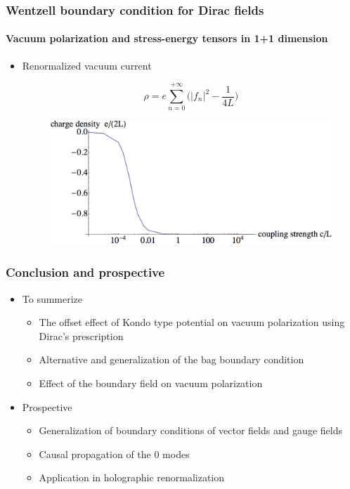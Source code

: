 \documentclass[french]{beamer}
\begin{document}
\begin{frame}
\frametitle{Wentzell boundary condition for Dirac fields}
\framesubtitle{Vacuum polarization and stress-energy tensors in 1+1 dimension}

\begin{itemize}
\item Renormalized vacuum current %

\begin{equation*}
\rho = e \sum_{n=0}^{+\infty}\big(|f_n|^2 -\frac{1}{4L} \big)
\end{equation*}


\begin{figure}[!h]
  \centering
  \includegraphics[height=0.4\textheight]{ex1d}
\end{figure}

\end{itemize}

\end{frame}
\begin{frame}
\frametitle{Conclusion and prospective}



\begin{itemize}

\item To summerize
 \begin{itemize}
 \item The offset effect of Kondo type potential on vacuum polarization using Dirac's prescription
 \item Alternative and generalization of the bag boundary condition
 \item Effect of the boundary field on vacuum polarization 
 \end{itemize}

\item Prospective
 \begin{itemize}
 \item Generalization of boundary conditions of vector fields and gauge fields
 \item Causal propagation of the 0 modes
 \item Application in holographic renormalization
 \end{itemize}

\end{itemize}


\end{frame}
\end{document}
